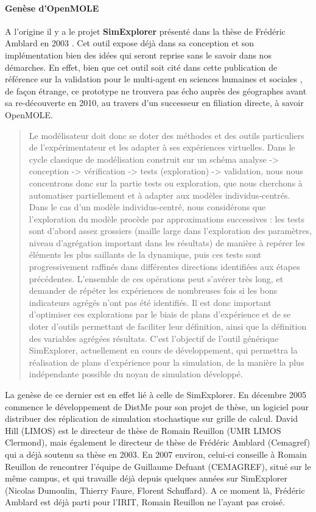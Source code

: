 \paragraph {Genèse d'OpenMOLE}

A l'origine il y a le projet \textbf{SimExplorer} présenté dans la thèse de  Frédéric Amblard en 2003 \autocite{Amblard2003}. Cet outil expose déjà dans sa conception et son implémentation bien des idées qui seront reprise sans le savoir dans nos démarches. En effet, bien que cet outil soit cité dans cette publication de référence sur la validation pour le multi-agent en sciences humaines et sociales \autocite{Amblard2006}, de façon étrange, ce prototype ne trouvera pas écho auprès des géographes avant sa re-découverte en 2010, au travers d'un successeur en filiation directe, à savoir OpenMOLE.

\blockquote[\cite{Amblard2002}]{Le modélisateur doit donc se doter des méthodes et des outils particuliers de l’expérimentateur et les adapter à ses expériences virtuelles. Dans le cycle classique de modélisation construit sur un schéma analyse -> conception -> vérification -> tests (exploration) -> validation, nous nous concentrons donc sur la partie tests ou exploration, que nous cherchons à automatiser partiellement et à adapter aux modèles individus-centrés. Dans le cas d’un modèle individus-centré, nous considérons que l’exploration du modèle procède par approximations successives : les tests sont d’abord assez grossiers (maille large dans l’exploration des paramètres, niveau d’agrégation important dans les résultats) de manière à repérer les éléments les plus saillants de la dynamique, puis ces tests sont progressivement raffinés dans différentes directions identifiées aux étapes précédentes. L’ensemble de ces opérations peut s’avérer très long, et demander de répéter les expériences de nombreuses fois si les bons indicateurs agrégés n’ont pas été identifiés. Il est donc important d’optimiser ces explorations par le biais de plans d’expérience et de se doter d’outils permettant de faciliter leur définition, ainsi que la définition des variables agrégées résultats. C’est l’objectif de l’outil générique SimExplorer, actuellement en cours de développement, qui permettra la réalisation de plans d’expérience pour la simulation, de la manière la plus indépendante possible du noyau de simulation développé.}

La genèse de ce dernier est en effet lié à celle de SimExplorer. En décembre 2005 \textcite{Reuillon2008} commence le développement de DistMe pour son projet de thèse, un logiciel pour distribuer des réplication de simulation stochastique sur grille de calcul. David Hill (LIMOS) est le directeur de thèse de Romain Reuillon (UMR LIMOS Clermond), mais également le directeur de thèse de Frédéric Amblard (Cemagref) qui a déjà soutenu sa thèse en 2003. En 2007 environ, celui-ci conseille à Romain Reuillon de rencontrer l'équipe de Guillaume Defuant (CEMAGREF), situé sur le même campus, et qui travaille déjà depuis quelques années sur SimExplorer (Nicolas Dumoulin, Thierry Faure, Florent Schuffard). A ce moment là, Frédéric Amblard est déjà parti pour l'IRIT, Romain Reuillon ne l'ayant pas croisé.

